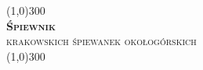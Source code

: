\documentclass[8pt,twocolumn]{extbook}
\begin{document}
    \begin{titlepage}
        \begin{center}
        \line(1,0){300}\\
        [0.5cm]
        \textsc{\huge{\bfseries Śpiewnik}}\\
        \textsc{\large krakowskich śpiewanek okołogórskich}\\
        [0.3cm]
        \line(1,0){300}\\
        \end{center}
        \clearpage
    \end{titlepage}
    \onecolumn
    \begin{multicols*}{2}
    \tableofcontents
    \end{multicols*}
    \twocolumn
    \thispagestyle{empty}
    \cleardoublepage
    \setcounter{page}{1}
    
    
    
    
    
    
\end{document}
